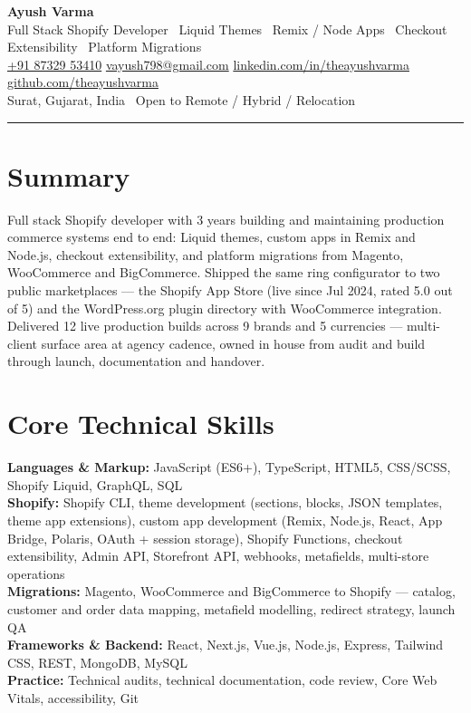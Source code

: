 \documentclass[10pt]{article}
\newcommand{\myphone}{\href{https://wa.me/918732953410}{+91 87329 53410}}
\begin{document}
\pagestyle{empty}

\begin{center}
{\Huge \bfseries Ayush Varma}\\[3pt]
{\small\color{textgray}
  Full Stack Shopify Developer \textbullet\ Liquid Themes \textbullet\ Remix / Node Apps \textbullet\ Checkout Extensibility \textbullet\ Platform Migrations
}\\[3pt]
{\small
  \myphone \quad
  \href{mailto:vayush798@gmail.com}{vayush798@gmail.com} \quad
  \href{https://linkedin.com/in/theayushvarma}{linkedin.com/in/theayushvarma} \quad
  \href{https://github.com/theayushvarma}{github.com/theayushvarma}
}\\[2pt]
{\small Surat, Gujarat, India \textbullet\ Open to Remote / Hybrid / Relocation}
\end{center}

\hrule

\section*{Summary}
Full stack Shopify developer with 3 years building and maintaining production commerce systems end to end: Liquid themes, custom apps in Remix and Node.js, checkout extensibility, and platform migrations from Magento, WooCommerce and BigCommerce. Shipped the same ring configurator to two public marketplaces --- the Shopify App Store (live since Jul 2024, rated 5.0 out of 5) and the WordPress.org plugin directory with WooCommerce integration. Delivered 12 live production builds across 9 brands and 5 currencies --- multi-client surface area at agency cadence, owned in house from audit and build through launch, documentation and handover.

\section*{Core Technical Skills}
\textbf{Languages \& Markup:} JavaScript (ES6+), TypeScript, HTML5, CSS/SCSS, Shopify Liquid, GraphQL, SQL \\
\textbf{Shopify:} Shopify CLI, theme development (sections, blocks, JSON templates, theme app extensions), custom app development (Remix, Node.js, React, App Bridge, Polaris, OAuth + session storage), Shopify Functions, checkout extensibility, Admin API, Storefront API, webhooks, metafields, multi-store operations \\
\textbf{Migrations:} Magento, WooCommerce and BigCommerce to Shopify --- catalog, customer and order data mapping, metafield modelling, redirect strategy, launch QA \\
\textbf{Frameworks \& Backend:} React, Next.js, Vue.js, Node.js, Express, Tailwind CSS, REST, MongoDB, MySQL \\
\textbf{Practice:} Technical audits, technical documentation, code review, Core Web Vitals, accessibility, Git \\
\end{document}
